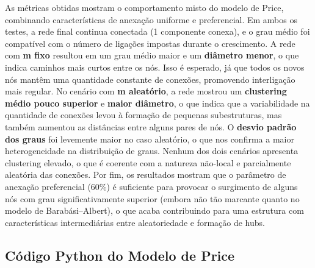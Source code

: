 \documentclass{article}
\begin{document}
As métricas obtidas mostram o comportamento misto do modelo de Price, combinando características de anexação uniforme e preferencial. Em ambos os testes, a rede final continua conectada (1 componente conexa), e o grau médio foi compatível com o número de ligações impostas durante o crescimento.
A rede com \textbf{m fixo} resultou em um grau médio maior e um \textbf{diâmetro menor}, o que indica caminhos mais curtos entre os nós. Isso é esperado, já que todos os novos nós mantêm uma quantidade constante de conexões, promovendo interligação mais regular.
No cenário com \textbf{m aleatório}, a rede mostrou um \textbf{clustering médio pouco superior} e \textbf{maior diâmetro}, o que indica que a variabilidade na quantidade de conexões levou à formação de pequenas subestruturas, mas também aumentou as distâncias entre alguns pares de nós.
O \textbf{desvio padrão dos graus} foi levemente maior no caso aleatório, o que nos confirma a maior heterogeneidade na distribuição de graus. Nenhum dos dois cenários apresenta clustering elevado, o que é coerente com a natureza não-local e parcialmente aleatória das conexões.
Por fim, os resultados mostram que o parâmetro de anexação preferencial (60\%) é suficiente para provocar o surgimento de alguns nós com grau significativamente superior (embora não tão marcante quanto no modelo de Barabási–Albert), o que acaba contribuindo para uma estrutura com características intermediárias entre aleatoriedade e formação de hubs.

\subsection{Código Python do Modelo de Price}
\end{document}
